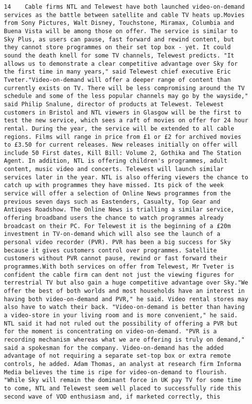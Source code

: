 \documentclass[11pt]{article}
\begin{document}
\begin{Verbatim}[commandchars=\\\{\}]
         14    Cable firms NTL and Telewest have both launched video-on-demand services as the battle between satellite and cable TV heats up.Movies from Sony Pictures, Walt Disney, Touchstone, Miramax, Columbia and Buena Vista will be among those on offer. The service is similar to Sky Plus, as users can pause, fast forward and rewind content, but they cannot store programmes on their set top box - yet. It could sound the death knell for some TV channels, Telewest predicts. "It allows us to demonstrate a clear competitive advantage over Sky for the first time in many years," said Telewest chief executive Eric Tveter."Video-on-demand will offer a deeper range of content than currently exists on TV. There will be less compromising around the TV schedule and some of the less popular channels may go by the wayside," said Philip Snalune, director of products at Telewest. Telewest customers in Bristol and NTL viewers in Glasgow will be the first to test the new service, which sees a raft of movies on offer for 24 hour rental. During the year, the service will be extended to all cable regions. Films will range in price from £1 or £2 for archived movies to £3.50 for current releases. New releases initially on offer will include 50 First dates, Kill Bill: Volume 2, Gothika and The Station Agent. In addition, NTL is offering children's programmes, adult content, music video and concerts. Telewest will launch similar services later in the year. NTL is also offering viewers the chance to catch up with programmes they have missed. Its pick of the week service will offer a selection of Online News programmes from the previous seven days such as Eastenders, Casualty, Top Gear and Antiques Roadshow. The Online News is trialling a similar service, offering broadband users the chance to watch programmes already broadcast on their PC. For Telewest it is the beginning of a £20m investment in TV-on-demand which will also see the launch of a personal video recorder (PVR). PVR has been a big success for Sky because it gives customers control over programmes. Satellite customers without PVR cannot pause, rewind or fast forward their programmes.With both services on offer from Telewest, Mr Tveter is confident the cable firm can dent not just the viewing figures for terrestrial TV but also gain a huge competitive advantage over Sky."We offer the best of both worlds and most households have an interest in having both video-on-demand and PVR," he said. Video rental stores may also have to watch their back. "Video-on-demand is better than having a video-store in your living room and is more convenient," he said. NTL said it had not ruled out the possibility of offering a PVR but for the moment is concentrating on video-on-demand. "PVR is a recording mechanism whereas what we are offering is truly on demand," said a spokesman for the company. Video-on-demand has the added advantage of not requiring a separate set-top box or extra remote controls, he added. Adam Thomas, an analyst at research firm Informa Media believes the time is ripe for video-on-demand to flourish. "While Sky will remain the dominant force in UK pay TV for some time to come, NTL and Telewest seem well placed to successfully ride this second wave of VOD enthusiasm and, if marketed correctly, this 
\end{Verbatim}
\end{document}
